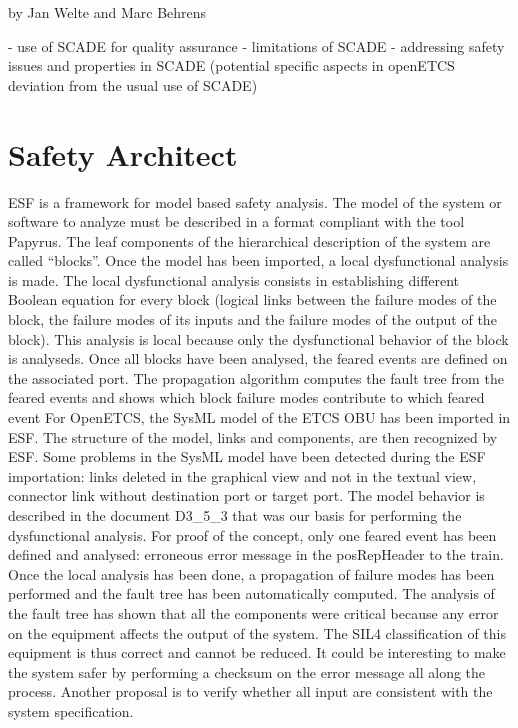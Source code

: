 \documentclass{template/openetcs_report}
\begin{document}
by Jan Welte and Marc Behrens

- use of SCADE for quality assurance
- limitations of SCADE
- addressing safety issues and properties in SCADE 
(potential specific aspects in openETCS deviation from the usual use of SCADE)


\section{Safety Architect}

ESF is a framework for model based safety analysis. The model of the system or software to analyze must be described in a format compliant with the tool Papyrus. The leaf components of the hierarchical description of the system are called “blocks”. Once the model has been imported, a local dysfunctional analysis is made. The local dysfunctional analysis consists in establishing different Boolean equation for every block (logical links between the failure modes of the block, the failure modes of its inputs and the failure modes of the output of the block). This analysis is local because only the dysfunctional behavior of the block is analyseds. Once all blocks have been analysed, the feared events are defined on the associated port. The propagation algorithm computes the fault tree from the feared events and shows which block failure modes contribute to which feared event
For OpenETCS, the SysML model of the ETCS OBU has been imported in ESF. The structure of the model, links and components, are then recognized by ESF. Some problems in the SysML model have been detected during the ESF importation: links deleted in the graphical view and not in the textual view, connector link without destination port or target port.
The model behavior is described in the document D3\_5\_3 that was our basis for performing the dysfunctional analysis. For proof of the concept, only one feared event has been defined and analysed: erroneous error message in the posRepHeader to the train. Once the local analysis has been done, a propagation of failure modes has been performed and the fault tree has been automatically computed. 
The analysis of the fault tree has shown that all the components were critical because any error on the equipment affects the output of the system. The SIL4 classification of this equipment is thus correct and cannot be reduced. It could be interesting to make the system safer by performing a checksum on the error message all along the process. Another proposal is to verify whether all input are consistent with the system specification.
\end{document}
